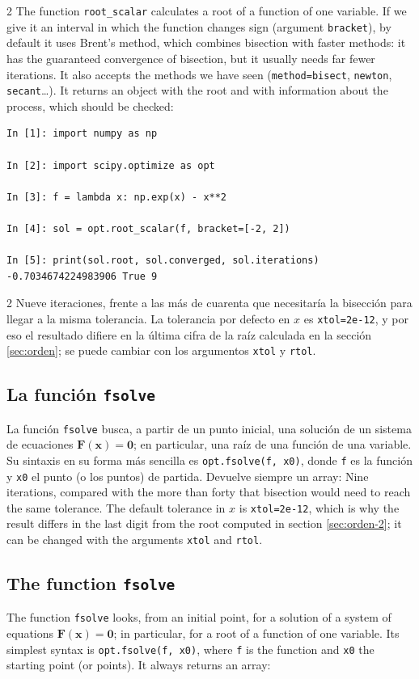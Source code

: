 \begin{paracol}{2}
The function \texttt{root\_scalar} calculates a root of a function of one variable. If we give it an interval in which the function changes sign (argument \texttt{bracket}), by default it uses Brent's method, which combines bisection with faster methods: it has the guaranteed convergence of bisection, but it usually needs far fewer iterations. It also accepts the methods we have seen (\texttt{method=\textquotesingle{}bisect\textquotesingle{}}, \texttt{\textquotesingle{}newton\textquotesingle{}}, \texttt{\textquotesingle{}secant\textquotesingle{}}\ldots). It returns an object with the root and with information about the process, which should be checked:
\end{paracol}
\begin{verbatim}
In [1]: import numpy as np

In [2]: import scipy.optimize as opt

In [3]: f = lambda x: np.exp(x) - x**2

In [4]: sol = opt.root_scalar(f, bracket=[-2, 2])

In [5]: print(sol.root, sol.converged, sol.iterations)
-0.7034674224983906 True 9
\end{verbatim}
\begin{paracol}{2}
Nueve iteraciones, frente a las más de cuarenta que necesitaría la bisección para llegar a la misma tolerancia. La tolerancia por defecto en $x$ es \texttt{xtol=2e-12}, y por eso el resultado difiere en la última cifra de la raíz calculada en la sección \ref{sec:orden}; se puede cambiar con los argumentos \texttt{xtol} y \texttt{rtol}.

\subsection{La función \texttt{fsolve}}

La función \texttt{fsolve} busca, a partir de un punto inicial, una solución de un sistema de ecuaciones $\mathbf{F}(\mathbf{x})=\mathbf{0}$; en particular, una raíz de una función de una variable. Su sintaxis en su forma más sencilla es \texttt{opt.fsolve(f, x0)}, donde \texttt{f} es la función y \texttt{x0} el punto (o los puntos) de partida. Devuelve siempre un array:
\switchcolumn
Nine iterations, compared with the more than forty that bisection would need to reach the same tolerance. The default tolerance in $x$ is \texttt{xtol=2e-12}, which is why the result differs in the last digit from the root computed in section \ref{sec:orden-2}; it can be changed with the arguments \texttt{xtol} and \texttt{rtol}.

\subsection{The function \texttt{fsolve}}

The function \texttt{fsolve} looks, from an initial point, for a solution of a system of equations $\mathbf{F}(\mathbf{x})=\mathbf{0}$; in particular, for a root of a function of one variable. Its simplest syntax is \texttt{opt.fsolve(f, x0)}, where \texttt{f} is the function and \texttt{x0} the starting point (or points). It always returns an array:
\end{paracol}
